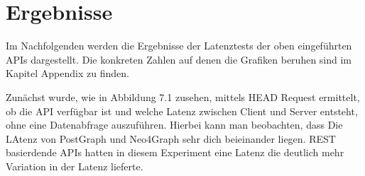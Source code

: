 \chapter{Ergebnisse} %
\label{sec:ergebnisse}
Im Nachfolgenden werden die Ergebnisse der Latenztests der oben eingeführten APIs dargestellt. Die konkreten Zahlen auf denen die Grafiken beruhen sind im Kapitel Appendix zu finden.

\noindent
Zunächst wurde, wie in Abbildung 7.1 zusehen, mittels HEAD Request ermittelt, ob die API verfügbar ist und welche Latenz zwischen Client und Server entsteht, ohne eine Datenabfrage auszuführen. Hierbei kann man beobachten, dass Die LAtenz von PostGraph und Neo4Graph sehr dich beieinander liegen. REST basierdende APIs hatten in diesem Experiment eine Latenz die deutlich mehr Variation in der Latenz lieferte.

